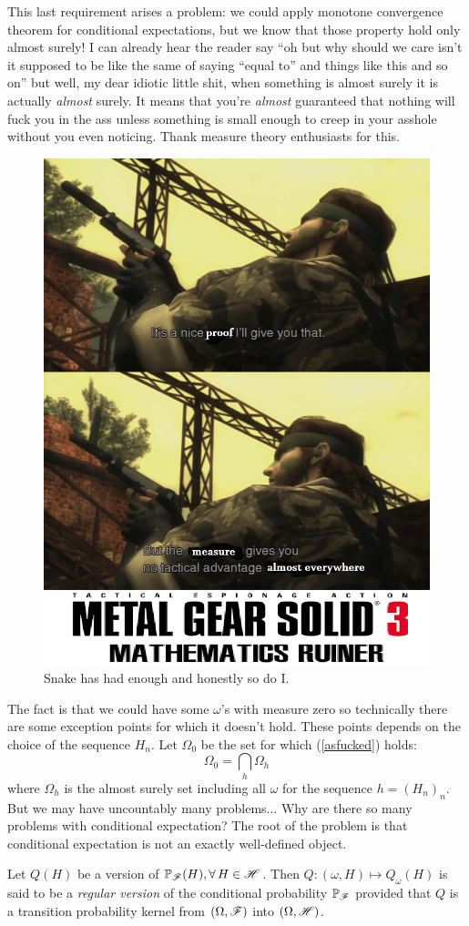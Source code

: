 \documentclass{report}
\begin{document}
This last requirement arises a problem: we could apply monotone convergence theorem for conditional expectations, but we know that those property hold only almost surely! I can already hear the reader say ``oh but why should we care isn't it supposed to be like the same of saying ``equal to'' and things like this and so on'' but well, my dear idiotic little shit, when something is almost surely it is actually \textit{almost} surely. It means that you're \textit{almost} guaranteed that nothing will fuck you in the ass unless something is small enough to creep in your asshole without you even noticing. Thank measure theory enthusiasts for this.
\begin{figure}[H]
	\centering
	\includegraphics[width=0.6\linewidth]{asnkae2}
	\caption{Snake has had enough and honestly so do I.}
	\label{fig:asnkae2}
\end{figure}
The fact is that we could have some $\omega$'s with measure zero so technically there are some exception points for which it doesn't hold. These points depends on the choice of the sequence $H_n$. Let $\Omega_0$ be the set for which (\ref{asfucked}) holds:
\[\Omega_0=\bigcap_h\Omega_h\]
where $\Omega_h$ is the almost surely  set including all $\omega$ for the sequence $h={(H_n)}_{n}$. But we may have uncountably many problems... Why are there so many problems with conditional expectation? The root of the problem is that conditional expectation is not an exactly well-defined object.
\begin{definition}
	Let $Q(H)$ be a version of $\mathbb{P}_{\mathscr{F}}(H),\forall\, H\in\mathscr{H}$. Then $Q:(\omega,H)\mapsto Q_\omega(H)$ is said to be a \emph{regular version} of the conditional probability $\mathbb{P}_{\mathscr{F}}$ provided that $Q$ is a transition probability kernel from $(\Omega,\mathscr{F})$ into $(\Omega, \mathscr{H})$.
\end{definition} 
\end{document}
